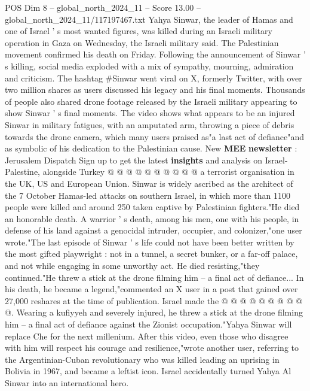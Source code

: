 \begin{textsample}{POS Dim 8 – global\_north\_2024\_11 – Score 13.00 – global\_north\_2024\_11/117197467.txt}  \label{ex:f8_pos_059}
Yahya Sinwar, the leader of Hamas and one of Israel ' s most wanted figures, was killed during an Israeli military operation in Gaza on Wednesday, the Israeli military said.
The Palestinian movement confirmed his death on Friday.
Following the announcement of Sinwar ' s killing, social media exploded with a mix of sympathy, mourning, admiration and criticism.
The hashtag \#Sinwar went viral on X, formerly Twitter, with over two million shares as users discussed his legacy and his final moments.
Thousands of people also shared drone footage released by the Israeli military appearing to show Sinwar ' s final moments.
The video shows what appears to be an injured Sinwar in military fatigues, with an amputated arm, throwing a piece of debris towards the drone camera, which many users praised as"a last act of defiance"and as symbolic of his dedication to the Palestinian cause.
New \textbf{MEE} \textbf{newsletter} : Jerusalem Dispatch Sign up to get the latest \textbf{insights} and analysis on Israel-Palestine, alongside Turkey @ @ @ @ @ @ @ @ @ @ a terrorist organisation in the UK, US and European Union.
Sinwar is widely ascribed as the architect of the 7 October Hamas-led attacks on southern Israel, in which more than 1100 people were killed and around 250 taken captive by Palestinian fighters."He died an honorable death.
A warrior ' s death, among his men, one with his people, in defense of his land against a genocidal intruder, occupier, and colonizer,"one user wrote."The last episode of Sinwar ' s life could not have been better written by the most gifted playwright : not in a tunnel, a secret bunker, or a far-off palace, and not while engaging in some unworthy act.
He died resisting,"they continued."He threw a stick at the drone filming him -- a final act of defiance...
In his death, he became a legend,"commented an X user in a post that gained over 27,000 reshares at the time of publication.
Israel made the @ @ @ @ @ @ @ @ @ @.
Wearing a kufiyyeh and severely injured, he threw a stick at the drone filming him -- a final act of defiance against the Zionist occupation."Yahya Sinwar will replace Che for the next millenium.
After this video, even those who disagree with him will respect his courage and resilience,"wrote another user, referring to the Argentinian-Cuban revolutionary who was killed leading an uprising in Bolivia in 1967, and became a leftist icon.
Israel accidentally turned Yahya Al Sinwar into an international hero.

\end{textsample}
